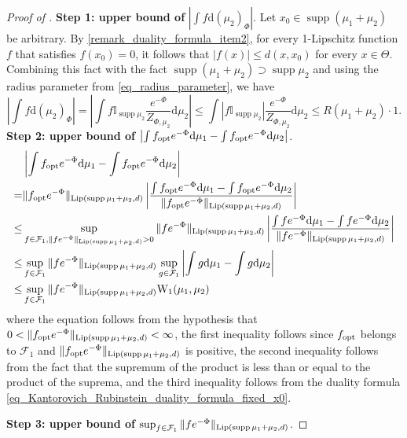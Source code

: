 \documentclass[a4paper]{scrartcl}
\theoremstyle{definition}
\numberwithin{equation}{section}
\newcommand{\rd}{\mathrm{d}}
\DeclareMathOperator{\supp}{supp}
\newcommand{\abs}[1]{\vert #1\vert}
\newcommand{\Abs}[1]{\left\vert#1\right\vert}
\newcommand{\norm}[1]{\Vert #1 \Vert}
\newcommand{\Lip}[0]{\textup{Lip}}
\newcommand{\Was}[0]{\textup{W}}
\newcommand{\opt}[0]{\textup{opt}}
\begin{document}
\begin{proof}[Proof of ]
 \textbf{Step 1: upper bound of} $ \Abs{\int f\rd (\mu_2)_\Phi }$.
 Let $x_0\in\supp{(\mu_1+\mu_2)}$ be arbitrary. 
  By \ref{remark_duality_formula_item2}, for every 1-Lipschitz function $f$ that satisfies $f(x_0)=0$, it follows that $\abs{f(x)}\leq d(x,x_0)$ for every $x\in\Theta$.
  Combining this fact with the fact $\supp{(\mu_1+\mu_2)}\supset\supp{\mu_2}$ and using the radius parameter from \eqref{eq_radius_parameter}, we have 
 \begin{equation*}
  \Abs{\int f\rd (\mu_2)_\Phi }=\Abs{\int f\mathbb{I}_{\supp{\mu_2}} \frac{e^{-\Phi}}{Z_{\Phi,\mu_2}}\rd \mu_2}\leq \int \Abs{f\mathbb{I}_{\supp{\mu_2}}} \frac{e^{-\Phi}}{Z_{\Phi,\mu_2}}\rd \mu_2\leq R(\mu_1+\mu_2)\cdot 1.
 \end{equation*}
\textbf{Step 2: upper bound of }$\Abs{\int f_\opt e^{-\Phi}\rd \mu_1-\int f_\opt e^{-\Phi}\rd \mu_2}$. 
\begin{align*}
&\Abs{\int f_\opt e^{-\Phi}\rd \mu_1-\int f_\opt e^{-\Phi}\rd \mu_2}
\\
=& \norm{f_\opt e^{-\Phi}}_{\Lip(\supp{\mu_1+\mu_2},d)}\Abs{\frac{\int  f_\opt e^{-\Phi}\rd \mu_1-\int  f_\opt e^{-\Phi}\rd \mu_2}{\norm{f_\opt e^{-\Phi}}_{\Lip(\supp{\mu_1+\mu_2},d)}}} 
  \\
  \leq & \sup_{f\in\mathcal{F}_1,\norm{fe^{-\Phi}}_{\Lip(\supp{\mu_1+\mu_2},d)}>0}\norm{fe^{-\Phi}}_{\Lip(\supp{\mu_1+\mu_2},d)} \Abs{\frac{\int  f e^{-\Phi}\rd \mu_1-\int  f e^{-\Phi}\rd \mu_2}{\norm{f e^{-\Phi}}_{\Lip(\supp{\mu_1+\mu_2},d)}}}
  \\
  \leq &\sup_{f\in\mathcal{F}_1}\norm{fe^{-\Phi}}_{\Lip(\supp{\mu_1+\mu_2},d)} \sup_{g\in\mathcal{F}_1}\Abs{\int g\rd \mu_1-\int g\rd \mu_2}
  \\
  \leq &\sup_{f\in\mathcal{F}_1}\norm{fe^{-\Phi}}_{\Lip(\supp{\mu_1+\mu_2},d)} \Was_1(\mu_1,\mu_2) 
\end{align*}
where the equation follows from the hypothesis that $ 0<\norm{f_\opt e^{-\Phi}}_{\Lip(\supp{\mu_1+\mu_2},d)}<\infty$, the first inequality follows since $f_\opt$ belongs to $\mathcal{F}_1$ and $\norm{f_\opt e^{-\Phi}}_{\Lip(\supp{\mu_1+\mu_2},d)}$ is positive, the second inequality follows from the fact that the supremum of the product is less than or equal to the product of the suprema, and the third inequality follows from the duality formula \eqref{eq_Kantorovich_Rubinstein_duality_formula_fixed_x0}.

\textbf{Step 3: upper bound of} $\sup_{f\in\mathcal{F}_1}\norm{fe^{-\Phi}}_{\Lip(\supp{\mu_1+\mu_2},d)}$.


\end{proof}
\end{document}
